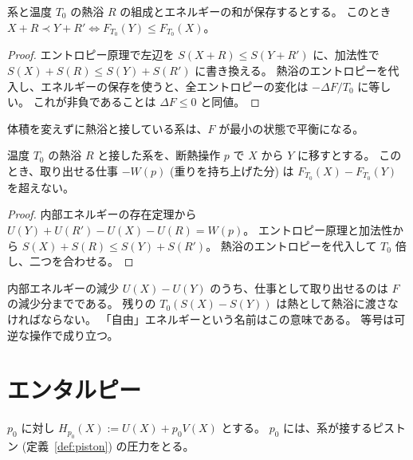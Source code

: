 \begin{theorem}
  \label{thm:helmholtz}
  \leanok
  系と温度 $T_0$ の熱浴 $R$ の組成とエネルギーの和が保存するとする。
  このとき $X + R \prec Y + R' \iff F_{T_0}(Y) \le F_{T_0}(X)$。
\end{theorem}

\begin{proof}
  \leanok
  エントロピー原理で左辺を $S(X + R) \le S(Y + R')$ に、加法性で $S(X) + S(R) \le S(Y) + S(R')$ に書き換える。
  熱浴のエントロピーを代入し、エネルギーの保存を使うと、全エントロピーの変化は $-\Delta F / T_0$ に等しい。
  これが非負であることは $\Delta F \le 0$ と同値。
\end{proof}

体積を変えずに熱浴と接している系は、$F$ が最小の状態で平衡になる。

\begin{theorem}[最大仕事の原理]
  \label{thm:max-work}
  \leanok
  温度 $T_0$ の熱浴 $R$ と接した系を、断熱操作 $p$ で $X$ から $Y$ に移すとする。
  このとき、取り出せる仕事 $-W(p)$ (重りを持ち上げた分) は $F_{T_0}(X) - F_{T_0}(Y)$ を超えない。
\end{theorem}

\begin{proof}
  \leanok
  内部エネルギーの存在定理から $U(Y) + U(R') - U(X) - U(R) = W(p)$。
  エントロピー原理と加法性から $S(X) + S(R) \le S(Y) + S(R')$。
  熱浴のエントロピーを代入して $T_0$ 倍し、二つを合わせる。
\end{proof}

内部エネルギーの減少 $U(X) - U(Y)$ のうち、仕事として取り出せるのは $F$ の減少分までである。
残りの $T_0 (S(X) - S(Y))$ は熱として熱浴に渡さなければならない。
「自由」エネルギーという名前はこの意味である。
等号は可逆な操作で成り立つ。

\section{エンタルピー}

\begin{definition}[エンタルピー]
  \label{def:enthalpy}
  \leanok
  $p_0$ に対し $H_{p_0}(X) := U(X) + p_0 V(X)$ とする。
  $p_0$ には、系が接するピストン (定義~\ref{def:piston}) の圧力をとる。
\end{definition}

